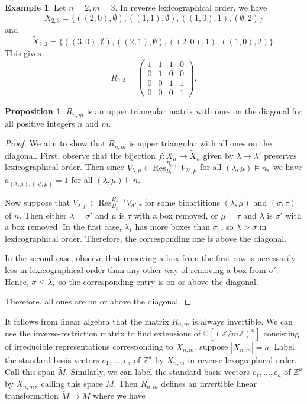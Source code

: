 \documentclass{amsart}
\theoremstyle{plain}
\theoremstyle{definition}
\newtheorem{example}[theorem]{Example}
\newtheorem{proposition}[theorem]{Proposition}
\newcommand{\C}{\mathbb{C}}
\newcommand{\Z}{\mathbb{Z}}
\begin{document}
\begin{example}
    Let $n=2,m=3$. In reverse lexicographical order, we have 
    $$ X_{2,3}= \{((2,0),\emptyset), ((1,1),\emptyset),((1,0),1),(\emptyset, 2)\}$$
    and 
    $$\tilde{X}_{2,3}= \{((3,0),\emptyset), ((2,1),\emptyset),((2,0),1),((1,0), 2)\}.$$ This gives 
    $$ R_{2,3}= \begin{pmatrix}
        1 & 1& 1& 0\\
        0&1&0& 0 \\
        0&0&1&1\\
        0&0&0&1
    \end{pmatrix}.
    $$
\end{example}


\begin{proposition}
    $R_{n,m}$ is an upper triangular matrix with ones on the diagonal for all positive integers $n$ and $m.$
\end{proposition}
\begin{proof}
We aim to show that $R_{n,m}$ is upper triangular with all ones on the diagonal. 
First, observe that the bijection $f: X_n\to \tilde{X}_n$ given by $\lambda \mapsto \lambda'$  preserves lexicographical order. Then since $V_{\lambda,\mu}\subset \mathrm{Res}^{B_{n+1}}_{B_n}V_{\lambda',\mu}$ for all $(\lambda,\mu)\vDash n,$ we have $a_{(\lambda,\mu),(\lambda',\mu)}=1$ for all $(\lambda,\mu)\vDash n.$

Now suppose that $V_{\lambda,\mu}\subset \mathrm{Res}^{B_{n+1}}_{B_n}V_{\sigma',\tau}$ for some bipartitions $(\lambda,\mu)$ and $(\sigma,\tau)$ of $n.$ Then either $\lambda=\sigma'$ and $\mu$ is $\tau$ with a box removed, or $\mu=\tau$ and $\lambda $ is $\sigma'$ with a box removed. In the first case, $\lambda_1$ has more boxes than $\sigma_1$, so $\lambda>\sigma$ in lexicographical order. Therefore, the corresponding one is above the diagonal. 

In the second case, observe that removing a box from the first row is necessarily less in lexicographical order than any other way of removing a box from $\sigma'.$ Hence, $\sigma \leq \lambda,$ so the corresponding entry is on or above the diagonal.  

Therefore, all ones are on or above the diagonal.
\end{proof}
It follows from linear algebra that the matrix $R_{n,m}$ is always invertible. 
We can use the inverse-restriction matrix to find extensions of $\C[(\Z/m\Z)^n] $ consisting of irreducible representations corresponding to $\tilde X_{n,m}.$ suppose $|X_{n,m}|= a.$ Label the standard basis vectors $e_1,\dots, e_a$ of $\Z^a$ by $\tilde X_{n,m}$ in reverse lexographical order. Call this span $\tilde M. $ Similarly, we can label the standard basis vectors $e_1,\dots, e_a$ of $\Z^a$ by $X_{n,m},$ calling this space $M.$ Then $R_{n,m}$ defines an invertible linear transformation $\tilde M\to M$ where we have 
\end{document}
